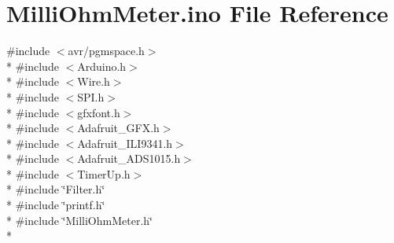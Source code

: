 \hypertarget{_milli_ohm_meter_8ino}{\section{Milli\-Ohm\-Meter.\-ino File Reference}
\label{_milli_ohm_meter_8ino}
}
{\ttfamily \#include $<$avr/pgmspace.\-h$>$}\\*
{\ttfamily \#include $<$Arduino.\-h$>$}\\*
{\ttfamily \#include $<$Wire.\-h$>$}\\*
{\ttfamily \#include $<$S\-P\-I.\-h$>$}\\*
{\ttfamily \#include $<$gfxfont.\-h$>$}\\*
{\ttfamily \#include $<$Adafruit\-\_\-\-G\-F\-X.\-h$>$}\\*
{\ttfamily \#include $<$Adafruit\-\_\-\-I\-L\-I9341.\-h$>$}\\*
{\ttfamily \#include $<$Adafruit\-\_\-\-A\-D\-S1015.\-h$>$}\\*
{\ttfamily \#include $<$Timer\-Up.\-h$>$}\\*
{\ttfamily \#include \char`\"{}Filter.\-h\char`\"{}}\\*
{\ttfamily \#include \char`\"{}printf.\-h\char`\"{}}\\*
{\ttfamily \#include \char`\"{}Milli\-Ohm\-Meter.\-h\char`\"{}}\\*
